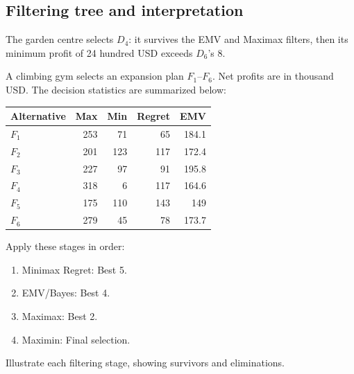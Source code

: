 \subsection*{Filtering tree and interpretation}
\begin{center}
\end{center}
The garden centre selects $D_4$: it survives the EMV and Maximax filters, then its minimum profit of 24 hundred USD exceeds $D_6$'s 8.
\secInicio[sec:q3]

A climbing gym selects an expansion plan $F_1$--$F_6$. Net profits are in thousand USD. The decision statistics are summarized below:
\vspace{-3mm}
\begin{center}\small\setlength{\tabcolsep}{4pt}
	\begin{tabular}{lrrrr}\toprule
		Alternative & Max & Min & Regret & EMV\\ \midrule
		$F_1$ & 253 & 71 & 65 & 184.1\\
		$F_2$ & 201 & 123 & 117 & 172.4\\
		$F_3$ & 227 & 97 & 91 & 195.8\\
		$F_4$ & 318 & 6 & 117 & 164.6\\
		$F_5$ & 175 & 110 & 143 & 149\\
		$F_6$ & 279 & 45 & 78 & 173.7\\
		\bottomrule
	\end{tabular}
\end{center}
\vspace{-3mm}
Apply these stages in order:
\begin{enumerate}[leftmargin=*]
	\item Minimax Regret: Best 5.
	\item EMV/Bayes: Best 4.
	\item Maximax: Best 2.
	\item Maximin: Final selection.
\end{enumerate}
Illustrate each filtering stage, showing survivors and eliminations.
\label{sol:q4table}
